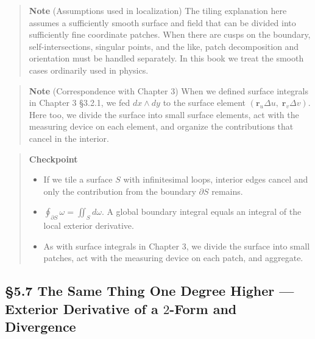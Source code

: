 \documentclass[a4paper,12pt,openany]{book}
\begin{document}
\begin{quote}
\textbf{Note} (Assumptions used in localization) The tiling explanation
here assumes a sufficiently smooth surface and field that can be divided
into sufficiently fine coordinate patches. When there are cusps on the
boundary, self-intersections, singular points, and the like, patch
decomposition and orientation must be handled separately. In this book
we treat the smooth cases ordinarily used in physics.
\end{quote}

\begin{quote}
\textbf{Note} (Correspondence with Chapter 3) When we defined surface
integrals in Chapter 3 §3.2.1, we fed \(dx \wedge dy\) to the surface
element \((\mathbf{r}_u\Delta u,\;\mathbf{r}_v\Delta v)\). Here too, we
divide the surface into small surface elements, act with the measuring
device on each element, and organize the contributions that cancel in
the interior.
\end{quote}

\begin{quote}
\textbf{Checkpoint}

\begin{itemize}
\item
  If we tile a surface \(S\) with infinitesimal loops, interior edges
  cancel and only the contribution from the boundary \(\partial S\)
  remains.
\item
  \(\oint_{\partial S} \omega = \iint_S d\omega\). A global boundary
  integral equals an integral of the local exterior derivative.
\item
  As with surface integrals in Chapter 3, we divide the surface into
  small patches, act with the measuring device on each patch, and
  aggregate.
\end{itemize}
\end{quote}

\par\vspace{0.35em}\par

\hypertarget{the-same-thing-one-degree-higher-exterior-derivative-of-a-2-form-and-divergence}{%
\subsection{\texorpdfstring{§5.7 The Same Thing One Degree Higher —
Exterior Derivative of a \(2\)-Form and
Divergence}{§5.7 The Same Thing One Degree Higher — Exterior Derivative of a 2-Form and Divergence}}\label{the-same-thing-one-degree-higher-exterior-derivative-of-a-2-form-and-divergence}}
\end{document}
